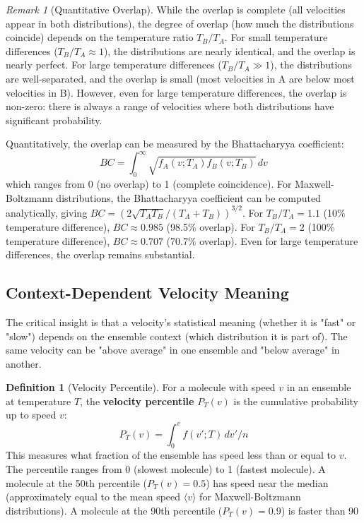 \documentclass[12pt,a4paper]{article}
\theoremstyle{definition}
\newtheorem{definition}[theorem]{Definition}
\theoremstyle{remark}
\newtheorem{remark}[theorem]{Remark}
\begin{document}
\begin{remark}[Quantitative Overlap]
\label{rem:quantitative_overlap}
While the overlap is complete (all velocities appear in both distributions), the degree of overlap (how much the distributions coincide) depends on the temperature ratio $T_B / T_A$. For small temperature differences ($T_B / T_A \approx 1$), the distributions are nearly identical, and the overlap is nearly perfect. For large temperature differences ($T_B / T_A \gg 1$), the distributions are well-separated, and the overlap is small (most velocities in A are below most velocities in B). However, even for large temperature differences, the overlap is non-zero: there is always a range of velocities where both distributions have significant probability.

Quantitatively, the overlap can be measured by the Bhattacharyya coefficient:
\begin{equation}
BC = \int_0^\infty \sqrt{f_A(v; T_A) f_B(v; T_B)} \, dv
\end{equation}
which ranges from 0 (no overlap) to 1 (complete coincidence). For Maxwell-Boltzmann distributions, the Bhattacharyya coefficient can be computed analytically, giving $BC = (2\sqrt{T_A T_B} / (T_A + T_B))^{3/2}$. For $T_B / T_A = 1.1$ (10\% temperature difference), $BC \approx 0.985$ (98.5\% overlap). For $T_B / T_A = 2$ (100\% temperature difference), $BC \approx 0.707$ (70.7\% overlap). Even for large temperature differences, the overlap remains substantial.
\end{remark}

\subsection{Context-Dependent Velocity Meaning}

The critical insight is that a velocity's statistical meaning (whether it is "fast" or "slow") depends on the ensemble context (which distribution it is part of). The same velocity can be "above average" in one ensemble and "below average" in another.

\begin{definition}[Velocity Percentile]
\label{def:velocity_percentile}
For a molecule with speed $v$ in an ensemble at temperature $T$, the \textbf{velocity percentile} $P_T(v)$ is the cumulative probability up to speed $v$:
\begin{equation}
P_T(v) = \int_0^v f(v'; T) \, dv' / n
\label{eq:velocity_percentile}
\end{equation}
This measures what fraction of the ensemble has speed less than or equal to $v$. The percentile ranges from 0 (slowest molecule) to 1 (fastest molecule). A molecule at the 50th percentile ($P_T(v) = 0.5$) has speed near the median (approximately equal to the mean speed $\langle v \rangle$ for Maxwell-Boltzmann distributions). A molecule at the 90th percentile ($P_T(v) = 0.9$) is faster than 90%
\end{definition}
\end{document}
